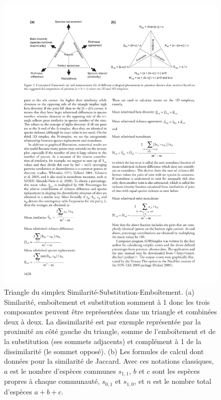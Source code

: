 \documentclass[
  11pt,
  french,
  a4paper,
  extrafontsizes,onecolumn,openright
  ]{memoir}
\begin{document}
\scriptsize

\begin{figure}

{\centering \includegraphics[width=1\linewidth]{images/Podani2011} 

}

\caption{Triangle du simplex Similarité-Substitution-Emboîtement. (a) Similarité, emboîtement et substitution somment à 1 donc les trois composantes peuvent être représentées dans un triangle et combinées deux à deux. La dissimilarité est par exemple représentée par la proximité au côté gauche du triangle, somme de l'emboîtement et de la substitution (ses sommets adjacents) et complément à 1 de la dissimilarité (le sommet opposé). (b) Les formules de calcul dont données pour la similarité de Jaccard. Avec ces notations classiques, \(a\) est le nombre d'espèces communes \(s_{1,1}\), \(b\) et \(c\) sont les espèces propres à chaque communauté, \(s_{0,1}\) et \(s_{1,0}\), et \(n\) est le nombre total d'espèces \(a+b+c\).}\label{fig:Podani2011}
\end{figure}
\end{document}
